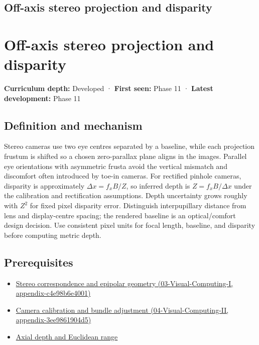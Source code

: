 \hypertarget{appendix-0976e86e5b9f}{}
\section*{Off-axis stereo projection and disparity}
\chapter{Off-axis stereo projection and disparity}\label{appendix-0976e86e5b9f-off-axis-stereo-projection-and-disparity}

\textbf{Curriculum depth:} Developed · \textbf{First seen:} Phase 11 · \textbf{Latest development:} Phase 11

\section{Definition and mechanism}\label{appendix-0976e86e5b9f-definition-and-mechanism}

Stereo cameras use two eye centres separated by a baseline, while each projection frustum is shifted so a chosen zero-parallax plane aligns in the images. Parallel eye orientations with asymmetric frusta avoid the vertical mismatch and discomfort often introduced by toe-in cameras. For rectified pinhole cameras, disparity is approximately \(\Delta x=f_xB/Z\), so inferred depth is \(Z=f_xB/\Delta x\) under the calibration and rectification assumptions. Depth uncertainty grows roughly with \(Z^2\) for fixed pixel disparity error. Distinguish interpupillary distance from lens and display-centre spacing; the rendered baseline is an optical/comfort design decision. Use consistent pixel units for focal length, baseline, and disparity before computing metric depth.

\section{Prerequisites}\label{appendix-0976e86e5b9f-prerequisites}

\begin{itemize}
\tightlist
\item
  \href{../03-Visual-Computing-I/main.pdf\#nameddest=appendix-c4e98b6e4001}{Stereo correspondence and epipolar geometry (03-Visual-Computing-I, appendix-c4e98b6e4001)}
\item
  \href{../04-Visual-Computing-II/main.pdf\#nameddest=appendix-3ee9861904d5}{Camera calibration and bundle adjustment (04-Visual-Computing-II, appendix-3ee9861904d5)}
\item
  \hyperref[appendix-cac01ebeeb11]{Axial depth and Euclidean range}
\end{itemize}

